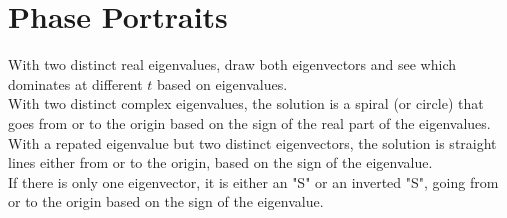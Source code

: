 \documentclass[12pt]{article}
\begin{document}
\section{Phase Portraits}
With two distinct real eigenvalues, draw both eigenvectors and see which dominates at different $t$ based on eigenvalues. \\
With two distinct complex eigenvalues, the solution is a spiral (or circle) that goes from or to the origin based on the sign of the real part of the eigenvalues. \\
With a repated eigenvalue but two distinct eigenvectors, the solution is straight lines either from or to the origin, based on the sign of the eigenvalue. \\
If there is only one eigenvector, it is either an "S" or an inverted "S", going from or to the origin based on the sign of the eigenvalue.
\end{document}

